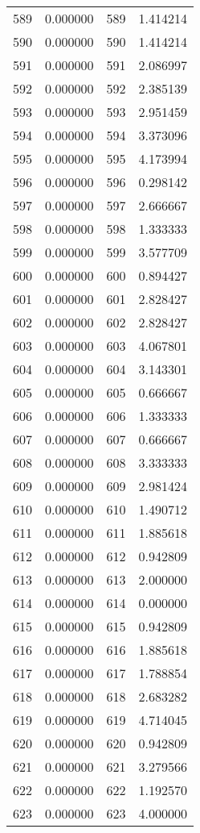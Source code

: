 \documentclass[12pt]{article}
\begin{document}
\begin{longtable}{@{}cccc@{}}
589 & 0.000000 & 589 & 1.414214 \\
590 & 0.000000 & 590 & 1.414214 \\
591 & 0.000000 & 591 & 2.086997 \\
592 & 0.000000 & 592 & 2.385139 \\
593 & 0.000000 & 593 & 2.951459 \\
594 & 0.000000 & 594 & 3.373096 \\
595 & 0.000000 & 595 & 4.173994 \\
596 & 0.000000 & 596 & 0.298142 \\
597 & 0.000000 & 597 & 2.666667 \\
598 & 0.000000 & 598 & 1.333333 \\
599 & 0.000000 & 599 & 3.577709 \\
600 & 0.000000 & 600 & 0.894427 \\
601 & 0.000000 & 601 & 2.828427 \\
602 & 0.000000 & 602 & 2.828427 \\
603 & 0.000000 & 603 & 4.067801 \\
604 & 0.000000 & 604 & 3.143301 \\
605 & 0.000000 & 605 & 0.666667 \\
606 & 0.000000 & 606 & 1.333333 \\
607 & 0.000000 & 607 & 0.666667 \\
608 & 0.000000 & 608 & 3.333333 \\
609 & 0.000000 & 609 & 2.981424 \\
610 & 0.000000 & 610 & 1.490712 \\
611 & 0.000000 & 611 & 1.885618 \\
612 & 0.000000 & 612 & 0.942809 \\
613 & 0.000000 & 613 & 2.000000 \\
614 & 0.000000 & 614 & 0.000000 \\
615 & 0.000000 & 615 & 0.942809 \\
616 & 0.000000 & 616 & 1.885618 \\
617 & 0.000000 & 617 & 1.788854 \\
618 & 0.000000 & 618 & 2.683282 \\
619 & 0.000000 & 619 & 4.714045 \\
620 & 0.000000 & 620 & 0.942809 \\
621 & 0.000000 & 621 & 3.279566 \\
622 & 0.000000 & 622 & 1.192570 \\
623 & 0.000000 & 623 & 4.000000 \\

\end{longtable}
\end{document}

